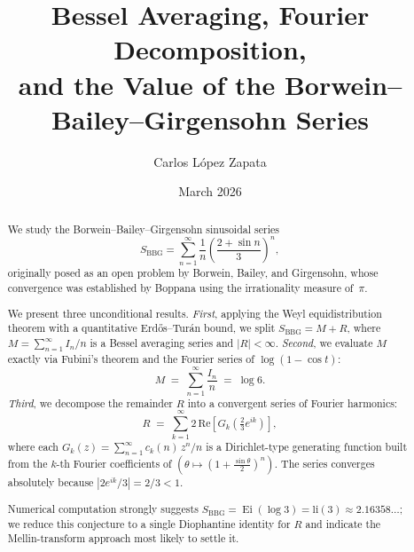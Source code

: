 \documentclass[12pt]{amsart}
\DeclareMathOperator{\Ei}{Ei}
\newcommand{\li}{\mathrm{li}}
\begin{document}
\title[Value of the Borwein--Bailey--Girgensohn Series]{
  Bessel Averaging, Fourier Decomposition,\\
  and the Value of the Borwein--Bailey--Girgensohn Series
}

\author{Carlos L\'opez Zapata}
\address{Formerly: Departamento de Ingenier\'ia El\'ectrica y Electr\'onica,
Universidad Pontificia Bolivariana, Medell\'in 050036, Colombia.\\
Current address: 70-214 Szczecin, West Pomerania, Poland.}
\date{March 2026}



\begin{abstract}
We study the Borwein--Bailey--Girgensohn sinusoidal series
\[
  S_{\mathrm{BBG}} = \sum_{n=1}^{\infty} \frac{1}{n}
  \!\left(\frac{2+\sin n}{3}\right)^{\!n},
\]
originally posed as an open problem by Borwein, Bailey, and
Girgensohn, whose convergence was established by
Boppana using the irrationality measure of~$\pi$.

We present three unconditional results.
\emph{First}, applying the Weyl equidistribution theorem with a
quantitative Erd\H{o}s--Tur\'an bound, we split
$S_{\mathrm{BBG}} = M + R$, where $M = \sum_{n=1}^{\infty} I_n/n$ is a
Bessel averaging series and $|R|<\infty$.
\emph{Second}, we evaluate $M$ exactly via Fubini's theorem and the
Fourier series of $\log(1-\cos t)$:
\[
  M \;=\; \sum_{n=1}^{\infty} \frac{I_n}{n} \;=\; \log 6.
\]
\emph{Third}, we decompose the remainder $R$ into a convergent
series of Fourier harmonics:
\[
  R \;=\; \sum_{k=1}^{\infty} 2\,\mathrm{Re}\!\left[
    G_k\!\!\left(\tfrac{2}{3}e^{ik}\right)\right],
\]
where each $G_k(z)=\sum_{n=1}^{\infty} c_k(n)\,z^n/n$ is a
Dirichlet-type generating function built from the $k$-th Fourier
coefficients of $(\theta\mapsto(1+\tfrac{\sin\theta}{2})^n)$.
The series converges absolutely because $|{2e^{ik}}/{3}| = 2/3 < 1$.

Numerical computation strongly suggests
$S_{\mathrm{BBG}} = \Ei(\log 3) = \li(3) \approx 2.16358\ldots$; we
reduce this conjecture to a single Diophantine identity for $R$ and
indicate the Mellin-transform approach most likely to settle it.
\end{abstract}
\end{document}
